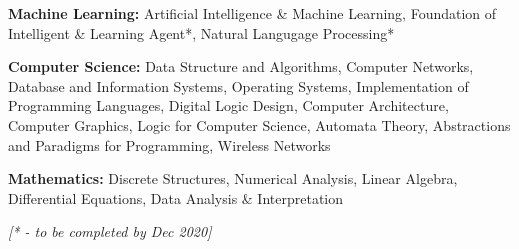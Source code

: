 \begin{cventries}
  \cventry
    {}
    {}
    {}
    {}
    {
    \vspace*{-0.4cm}
      \begin{cvitems}
        \item {\textbf{Machine Learning: }\hspace{0.9mm}Artificial Intelligence \& Machine Learning, Foundation of Intelligent \& Learning Agent*, \hspace*{3.2cm}Natural Langugage Processing*}
        \vspace{0.5mm}
        \item {\textbf{Computer Science: }\hspace{0.7mm}Data Structure and Algorithms, Computer Networks, Database and Information Systems, \hspace*{3.2cm}Operating Systems, Implementation of Programming Languages, Digital Logic Design, \hspace*{3.2cm}Computer Architecture, Computer Graphics, Logic for Computer Science, Automata Theory, \hspace*{3.2cm}Abstractions and Paradigms for Programming, Wireless Networks }
        \vspace{0.5mm}
        \item{\textbf{Mathematics: }\hspace{8.5mm}Discrete Structures, Numerical Analysis, Linear Algebra, Differential Equations, \hspace*{3.2cm}Data Analysis \& Interpretation\newline}
      \end{cvitems} 
    }
    
\end{cventries}
\vspace*{-0.8cm}
\hfill \fontsize{9pt}{1em} {\slshape\color{black} [* - to be completed by Dec 2020]}

\vspace{-0.8mm}
